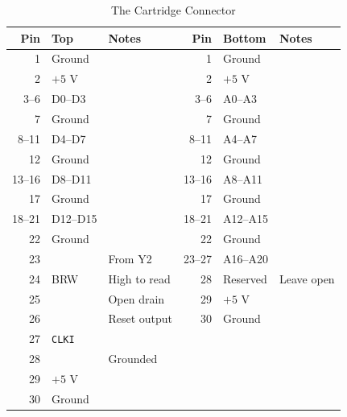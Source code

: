 \begin{table}[H]
	\centering
	\small
	\begin{tabular}{rllrll}
		\toprule
		\textbf{Pin} & \textbf{Top}     & \textbf{Notes} & \textbf{Pin} & \textbf{Bottom} & \textbf{Notes} \\
		\midrule
		1            & Ground           &                & 1            & Ground          &                \\
		2            & $+5$ V           &                & 2            & $+5$ V          &                \\
		3--6         & D0--D3           &                & 3--6         & A0--A3          &                \\
		7            & Ground           &                & 7            & Ground          &                \\
		8--11        & D4--D7           &                & 8--11        & A4--A7          &                \\
		12           & Ground           &                & 12           & Ground          &                \\
		13--16       & D8--D11          &                & 13--16       & A8--A11         &                \\
		17           & Ground           &                & 17           & Ground          &                \\
		18--21       & D12--D15         &                & 18--21       & A12--A15        &                \\
		22           & Ground           &                & 22           & Ground          &                \\
		23           & \activelow{CS}   & From Y2        & 23--27       & A16--A20        &                \\
		24           & BRW              & High to read   & 28           & Reserved        & Leave open     \\
		25           & \activelow{IRQ1} & Open drain     & 29           & $+5$ V          &                \\
		26           & \activelow{RSTO} & Reset output   & 30           & Ground          &                \\
		27           & \texttt{CLKI}    &                &              &                 &                \\
		28           & \activelow{CART} & Grounded       &              &                 &                \\
		29           & $+5$ V           &                &              &                 &                \\
		30           & Ground           &                &              &                 &                \\
		\bottomrule
	\end{tabular}
	\caption{The Cartridge Connector}
	\label{tab:cartridge-connector}
\end{table}

